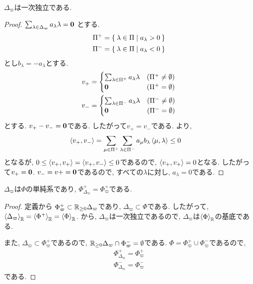 \begin{lemma}
  \label{lem:simple:linidep}
$\Delta_{\varpi}$は一次独立である.
\end{lemma}
\begin{proof}
  $\sum_{\lambda\in\Delta_{\varpi}}a_\lambda \lambda = \boldsymbol{0}$
  とする.
  \begin{align*}
    \Pi^+&=\Set{\lambda\in\Pi|a_\lambda >0}\\
    \Pi^-&=\Set{\lambda\in\Pi|a_\lambda <0}
  \end{align*}
  とし$b_\lambda=-a_\lambda$とする.
  \begin{align*}
    v_+&=
\begin{cases}
  \sum_{\lambda\in\Pi^+}a_\lambda\lambda&(\Pi^+\neq \emptyset)\\
  \boldsymbol{0}&(\Pi^+= \emptyset)
\end{cases}\\
v_-&=
\begin{cases}
\sum_{\lambda\in\Pi^-}a_\lambda\lambda&(\Pi^-\neq \emptyset)\\
  \boldsymbol{0}&(\Pi^-= \emptyset)
\end{cases}
  \end{align*}
  とする. $v_+-v_-=\boldsymbol{0}$である.
  したがって$v_+=v_-$である.
より,
  \begin{align*}
    \Braket{v_+,v_-}&
    =\sum_{\mu\in\Pi^+}\sum_{\lambda\in\Pi^-}a_\mu b_\lambda \Braket{\mu,\lambda}
    \leq 0 
  \end{align*}
  となるが, $0\leq \Braket{v_+,v_+}=\Braket{v_+,v_-}\leq 0$であるので,
  $\Braket{v_+,v_+}=0$となる.  したがって$v_+=\boldsymbol{0}$.
  $v_-=v+=\boldsymbol{0}$であるので,
  すべての$\lambda$に対し,
  $a_\lambda=0$である.
\end{proof}



\begin{prop}
  $\Delta_{\varpi}$は$\Phi$の単純系であり,
  $\Phi^+_{\Delta_{\varpi}}=\Phi_{\varpi}^+$である.
\end{prop}
\begin{proof}
  定義から
  $\Phi_{\varpi}^+\subset \mathbb{R}_{\geq 0}\Delta_{\varpi}$であり,
  $\Delta_{\varpi}\subset\Phi$である.
  したがって, $\Braket{\Delta_{\varpi}}_{\mathbb{R}}=\Braket{\Phi^+}_{\mathbb{R}}=\Braket{\Phi}_{\mathbb{R}}$.
  から, $\Delta_{\varpi}$は一次独立であるので,
  $\Delta_{\varpi}$は$\Braket{\Phi}_{\mathbb{R}}$の基底である.

  また, $\Delta_{\varpi}\subset \Phi_{\varpi}^+$であるので,
  $\mathbb{R}_{\geq 0}\Delta_{\varpi}\cap \Phi_{\varpi}^-=\emptyset$である.
  $\Phi=\Phi_{\varpi}^+\cup \Phi_{\varpi}^-$であるので,
  \begin{align*}
    \Phi_{\Delta_{\varpi}}^+=\Phi_{\varpi}^+\\
    \Phi_{\Delta_{\varpi}}^-=\Phi_{\varpi}^-
  \end{align*}
  である.
\end{proof}


